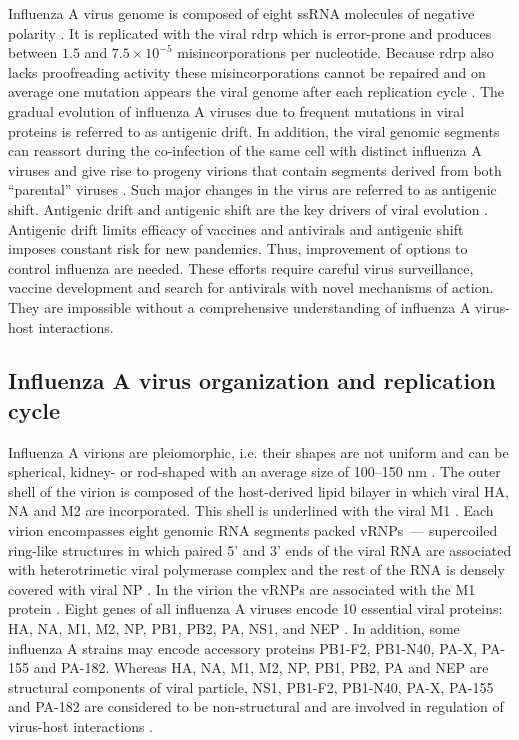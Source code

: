 	Influenza A virus genome is composed of eight \gls{ssRNA} molecules of negative polarity  \parencite{Palese1977}. It is replicated with the viral \gls{rdrp} which is error-prone and produces between $1.5$ and $7.5\times10^{-5}$ misincorporations per nucleotide. Because \gls{rdrp} also lacks proofreading activity these misincorporations cannot be repaired and on average one mutation appears the viral genome after each replication cycle \parencite{Drake1993, Parvin1986}. The gradual evolution of influenza A viruses due to frequent mutations in viral proteins is referred to as antigenic drift. In addition, the viral genomic segments can reassort during the co-infection of the same cell with distinct influenza A viruses and give rise to progeny virions that contain segments derived from both ``parental'' viruses \parencite{McGeoch1976, Desselberger1978}. Such major changes in the virus are referred to as antigenic shift. Antigenic drift and antigenic shift are the key drivers of viral evolution \parencite{Forrest2010}. Antigenic drift limits efficacy of vaccines and  antivirals and antigenic shift imposes constant risk for new pandemics. Thus, improvement of options to control influenza are needed. These efforts require careful virus surveillance, vaccine development and search for antivirals with novel mechanisms of action. They are impossible without a comprehensive understanding of influenza A virus-host interactions.
	
\subsection{Influenza A virus organization and replication cycle}

	Influenza A virions are pleiomorphic, i.e. their shapes are not uniform and can be spherical, kidney- or rod-shaped with an average size of 100--150 nm \parencite{Fujiyoshi1994}. The outer shell of the virion is composed of the host-derived lipid bilayer in which viral \gls{HA}, \gls{NA} and \gls{M2} are incorporated. This shell is underlined with the viral \gls{M1} \parencite{Harris2006}. Each virion encompasses eight genomic RNA segments packed \glspl{vRNP}~--- supercoiled ring-like structures in which paired 5' and 3' ends of the viral RNA are associated with heterotrimetic viral polymerase complex and the rest of the RNA is densely covered with viral \gls{NP} \parencite{Arranz2012}. In the virion the \glspl{vRNP} are associated with the \gls{M1} protein \parencite{Rees1982, Ye1999}. Eight genes of all influenza A viruses encode 10 essential viral proteins: \gls{HA}, \gls{NA}, \gls{M1}, \gls{M2}, \gls{NP}, \gls{PB1}, \gls{PB2}, \gls{PA}, \gls{NS1}, and \gls{NEP} \parencite{Lamb1983}. In addition, some influenza A strains may encode accessory proteins PB1-F2, PB1-N40, PA-X, PA-155 and PA-182. Whereas \gls{HA}, \gls{NA}, \gls{M1}, \gls{M2}, \gls{NP}, \gls{PB1}, \gls{PB2}, \gls{PA} and \gls{NEP} are structural components of viral particle, \gls{NS1}, PB1-F2, PB1-N40, PA-X, PA-155 and PA-182 are considered to be non-structural and are involved in regulation of virus-host interactions \parencite{Chen2001,Hale2008b,Wise2009,Jagger2012,Muramoto2013}.
	
